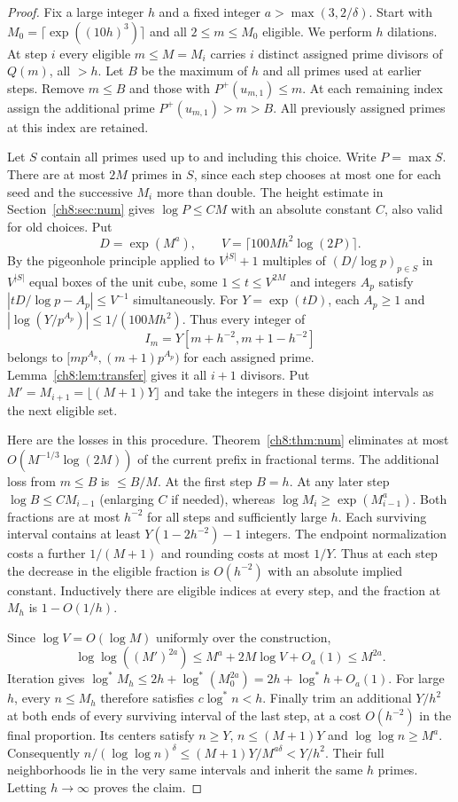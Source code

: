 \documentclass[11pt,a4paper,oneside,openany]{report}
\theoremstyle{remark}\newtheorem{remark}[theorem]{Remark}
\numberwithin{equation}{section}
\begin{document}
\begin{proof}
Fix a large integer $h$ and a fixed integer $a>\max(3,2/\delta)$. Start with $M_0=\lceil\exp((10h)^3)\rceil$ and all $2\le m\le M_0$ eligible. We perform $h$ dilations. At step $i$ every eligible $m\le M=M_i$ carries $i$ distinct assigned prime divisors of $Q(m)$, all $>h$. Let $B$ be the maximum of $h$ and all primes used at earlier steps. Remove $m\le B$ and those with $P^+(u_{m,1})\le m$. At each remaining index assign the additional prime $P^+(u_{m,1})>m>B$. All previously assigned primes at this index are retained.

Let $S$ contain all primes used up to and including this choice. Write $P=\max S$. There are at most $2M$ primes in $S$, since each step chooses at most one for each seed and the successive $M_i$ more than double. The height estimate in Section~\ref{ch8:sec:num} gives $\log P\le C M$ with an absolute constant $C$, also valid for old choices. Put
\[
       D=\exp(M^a),\qquad V=\lceil100Mh^2\log(2P)\rceil.
\]
By the pigeonhole principle applied to $V^{|S|}+1$ multiples of $(D/\log p)_{p\in S}$ in $V^{|S|}$ equal boxes of the unit cube, some $1\le t\le V^{2M}$ and integers $A_p$ satisfy
$|tD/\log p-A_p|\le V^{-1}$ simultaneously. For $Y=\exp(tD)$, each $A_p\ge1$ and $|\log(Y/p^{A_p})|\le 1/(100Mh^2)$. Thus every integer of
\[
     I_m=Y[m+h^{-2},m+1-h^{-2}]
\]
belongs to $[mp^{A_p},(m+1)p^{A_p})$ for each assigned prime. Lemma~\ref{ch8:lem:transfer} gives it all $i+1$ divisors. Put $M'=M_{i+1}=\lfloor(M+1)Y\rfloor$ and take the integers in these disjoint intervals as the next eligible set.

Here are the losses in this procedure. Theorem~\ref{ch8:thm:num} eliminates at most $O(M^{-1/3}\log(2M))$ of the current prefix in fractional terms. The additional loss from $m\le B$ is $\le B/M$. At the first step $B=h$. At any later step $\log B\le C M_{i-1}$ (enlarging $C$ if needed), whereas $\log M_i\ge\exp(M_{i-1}^a)$. Both fractions are at most $h^{-2}$ for all steps and sufficiently large $h$. Each surviving interval contains at least $Y(1-2h^{-2})-1$ integers. The endpoint normalization costs a further $1/(M+1)$ and rounding costs at most $1/Y$. Thus at each step the decrease in the eligible fraction is $O(h^{-2})$ with an absolute implied constant. Inductively there are eligible indices at every step, and the fraction at $M_h$ is $1-O(1/h)$.

Since $\log V=O(\log M)$ uniformly over the construction,
\[
 \log\log((M')^{2a})\le M^a+2M\log V+O_a(1)\le M^{2a}.
\]
Iteration gives $\log^* M_h\le2h+\log^*(M_0^{2a})=2h+\log^*h+O_a(1)$. For large $h$, every $n\le M_h$ therefore satisfies $c\log^*n<h$. Finally trim an additional $Y/h^2$ at both ends of every surviving interval of the last step, at a cost $O(h^{-2})$ in the final proportion. Its centers satisfy $n\ge Y$, $n\le(M+1)Y$ and $\log\log n\ge M^a$. Consequently $n/(\log\log n)^\delta\le(M+1)Y/M^{a\delta}<Y/h^2$. Their full neighborhoods lie in the very same intervals and inherit the same $h$ primes. Letting $h\to\infty$ proves the claim.
\end{proof}
\end{document}

